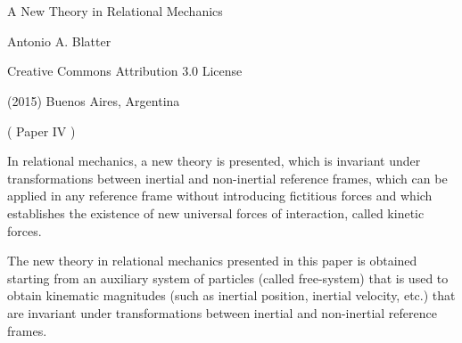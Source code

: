 \documentclass[10pt]{article}
\begin{document}
\newpage

\setcounter{page}{1}

\section*{}

\begin{center}

{\LARGE A New Theory in Relational Mechanics}

\bigskip \medskip

{\large Antonio A. Blatter}

\bigskip \medskip

\small

Creative Commons Attribution 3.0 License

\smallskip

(2015) Buenos Aires, Argentina

\medskip

{\sc ( Paper IV )}

\smallskip

\bigskip \medskip

\parbox{107.40mm}{In relational mechanics, a new theory is presented, which is invariant under transformations between inertial and non-inertial reference frames, which can be applied in any reference frame without introducing fictitious forces and which establishes the existence of new universal forces of interaction, called kinetic forces.}

\end{center}

\normalsize

\vspace{-1.20em}

\par {}

\par \bigskip\smallskip \noindent The new theory in relational mechanics presented in this paper is obtained starting from an auxiliary system of particles (called free-system) that is used to obtain kinematic magnitudes (such as inertial position, inertial velocity, etc.) that are invariant under transformations between inertial and non-inertial reference frames.
\end{document}
